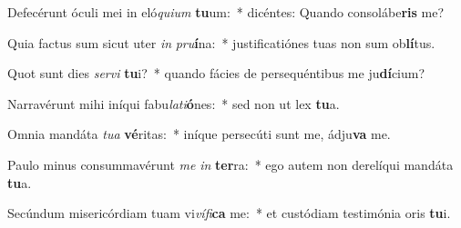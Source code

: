 \item Defecérunt óculi mei in eló\textit{qui}\textit{um} \textbf{tu}um:~* dicéntes: Quando consolábe\textbf{ris} me?
\item Quia factus sum sicut uter \textit{in} \textit{pru}\textbf{í}na:~* justificatiónes tuas non sum ob\textbf{lí}tus.
\item Quot sunt dies \textit{ser}\textit{vi} \textbf{tu}i?~* quando fácies de persequéntibus me ju\textbf{dí}cium?
\item Narravérunt mihi iníqui fabu\textit{la}\textit{ti}\textbf{ó}nes:~* sed non ut lex \textbf{tu}a.
\item Omnia mandáta \textit{tu}\textit{a} \textbf{vé}ritas:~* iníque persecúti sunt me, ádju\textbf{va} me.
\item Paulo minus consummavérunt \textit{me} \textit{in} \textbf{ter}ra:~* ego autem non derelíqui mandáta \textbf{tu}a.
\item Secúndum misericórdiam tuam vi\textit{ví}\textit{fi}\textbf{ca} me:~* et custódiam testimónia oris \textbf{tu}i.
